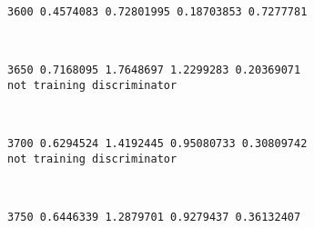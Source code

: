 \documentclass[11pt]{article}
\begin{document}
    \begin{Verbatim}[commandchars=\\\{\}]
3600 0.4574083 0.72801995 0.18703853 0.7277781

    \end{Verbatim}

    \begin{center}
    \end{center}
    { \hspace*{\fill} \\}
    
    \begin{Verbatim}[commandchars=\\\{\}]
3650 0.7168095 1.7648697 1.2299283 0.20369071
not training discriminator

    \end{Verbatim}

    \begin{center}
    \end{center}
    { \hspace*{\fill} \\}
    
    \begin{Verbatim}[commandchars=\\\{\}]
3700 0.6294524 1.4192445 0.95080733 0.30809742
not training discriminator

    \end{Verbatim}

    \begin{center}
    \end{center}
    { \hspace*{\fill} \\}
    
    \begin{Verbatim}[commandchars=\\\{\}]
3750 0.6446339 1.2879701 0.9279437 0.36132407

    \end{Verbatim}

    \begin{center}
    \end{center}
    { \hspace*{\fill} \\}
    
\end{document}

